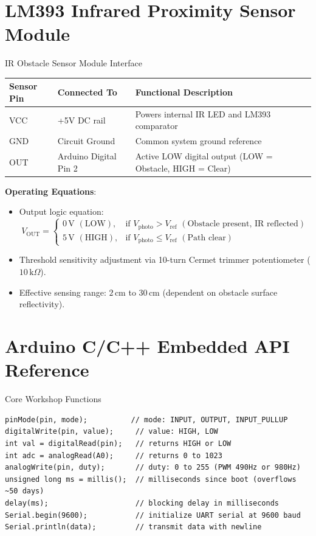 \section{LM393 Infrared Proximity Sensor Module}
\begin{formulabox}{IR Obstacle Sensor Module Interface}
\begin{center}
\begin{tabular}{lll}
\toprule
\textbf{Sensor Pin} & \textbf{Connected To} & \textbf{Functional Description} \\
\midrule
VCC & +5V DC rail & Powers internal IR LED and LM393 comparator \\
GND & Circuit Ground & Common system ground reference \\
OUT & Arduino Digital Pin 2 & Active LOW digital output (LOW = Obstacle, HIGH = Clear) \\
\bottomrule
\end{tabular}
\end{center}
\textbf{Operating Equations}:
\begin{itemize}
    \item Output logic equation:
    \[ V_{\mathrm{OUT}} = \begin{cases} 0\,\mathrm{V}\,\,(\text{LOW}), & \text{if } V_{\mathrm{photo}} > V_{\mathrm{ref}}\,\,(\text{Obstacle present, IR reflected}) \\ 5\,\mathrm{V}\,\,(\text{HIGH}), & \text{if } V_{\mathrm{photo}} \le V_{\mathrm{ref}}\,\,(\text{Path clear}) \end{cases} \]
    \item Threshold sensitivity adjustment via 10-turn Cermet trimmer potentiometer ($10\,\mathrm{k}\Omega$).
    \item Effective sensing range: $2\,\mathrm{cm}$ to $30\,\mathrm{cm}$ (dependent on obstacle surface reflectivity).
\end{itemize}
\end{formulabox}

\section{Arduino C/C++ Embedded API Reference}
\begin{formulabox}{Core Workshop Functions}
\begin{verbatim}
pinMode(pin, mode);          // mode: INPUT, OUTPUT, INPUT_PULLUP
digitalWrite(pin, value);     // value: HIGH, LOW
int val = digitalRead(pin);   // returns HIGH or LOW
int adc = analogRead(A0);     // returns 0 to 1023
analogWrite(pin, duty);       // duty: 0 to 255 (PWM 490Hz or 980Hz)
unsigned long ms = millis();  // milliseconds since boot (overflows ~50 days)
delay(ms);                    // blocking delay in milliseconds
Serial.begin(9600);           // initialize UART serial at 9600 baud
Serial.println(data);         // transmit data with newline
\end{verbatim}
\end{formulabox}
